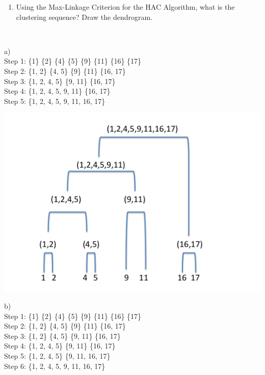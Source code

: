 \documentclass[12pt,letterpaper]{article}
\begin{document}
\begin{enumerate}
{{\begin{enumerate}
	\item Using the Max-Linkage Criterion for the HAC Algorithm, what is the clustering sequence?
Draw the dendrogram.
\end{enumerate} 
}} \\
\begin{solution}
a) \\
Step 1: \{1\} \{2\} \{4\} \{5\} \{9\} \{11\} \{16\} \{17\}\\
Step 2: \{1, 2\} \{4, 5\} \{9\} \{11\} \{16, 17\}\\
Step 3: \{1, 2, 4, 5\} \{9, 11\} \{16, 17\}\\
Step 4: \{1, 2, 4, 5, 9, 11\} \{16, 17\} \\
Step 5: \{1, 2, 4, 5, 9, 11, 16, 17\} 
\begin{center}
\includegraphics[scale=.5]{min_linkage.png}
\end{center}
b) \\
Step 1: \{1\} \{2\} \{4\} \{5\} \{9\} \{11\} \{16\} \{17\}\\
Step 2: \{1, 2\} \{4, 5\} \{9\} \{11\} \{16, 17\}\\
Step 3: \{1, 2\} \{4, 5\} \{9, 11\} \{16, 17\} \\
Step 4: \{1, 2, 4, 5\} \{9, 11\} \{16, 17\}\\
Step 5: \{1, 2, 4, 5\} \{9, 11, 16, 17\}\\
Step 6: \{1, 2, 4, 5, 9, 11, 16, 17\}
\begin{center}

\end{center}
\end{solution}
\end{enumerate}
\end{document}
